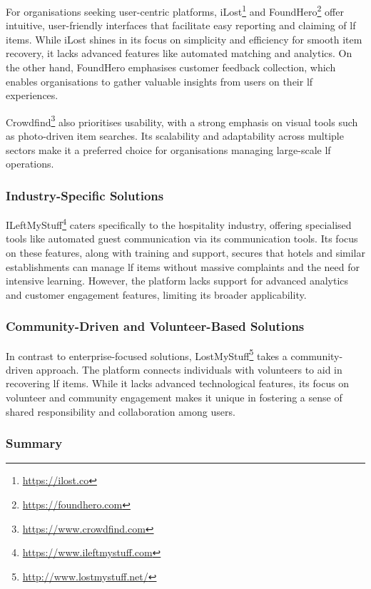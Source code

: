 For organisations seeking user-centric platforms, iLost\footnote{\url{https://ilost.co}} and FoundHero\footnote{\url{https://foundhero.com}} offer intuitive, user-friendly interfaces that facilitate easy reporting and claiming of \ac{lf} items. While iLost shines in its focus on simplicity and efficiency for smooth item recovery, it lacks advanced features like automated matching and analytics. On the other hand, FoundHero emphasises customer feedback collection, which enables organisations to gather valuable insights from users on their \ac{lf} experiences.

Crowdfind\footnote{\url{https://www.crowdfind.com}} also prioritises usability, with a strong emphasis on visual tools such as photo-driven item searches. Its scalability and adaptability across multiple sectors make it a preferred choice for organisations managing large-scale \ac{lf} operations.

\subsubsection{Industry-Specific Solutions} \label{subsubsec:industry-specific-solutions}

ILeftMyStuff\footnote{\url{https://www.ileftmystuff.com}} caters specifically to the hospitality industry, offering specialised tools like automated guest communication via its communication tools. Its focus on these features, along with training and support, secures that hotels and similar establishments can manage \ac{lf} items without massive complaints and the need for intensive learning. However, the platform lacks support for advanced analytics and customer engagement features, limiting its broader applicability.

\subsubsection{Community-Driven and Volunteer-Based Solutions} \label{subsubsec:community-driven-solutions}

In contrast to enterprise-focused solutions, LostMyStuff\footnote{\url{http://www.lostmystuff.net/}} takes a community-driven approach. The platform connects individuals with volunteers to aid in recovering \ac{lf} items. While it lacks advanced technological features, its focus on volunteer and community engagement makes it unique in fostering a sense of shared responsibility and collaboration among users.

\subsubsection{Summary} \label{subsubsec:lfms_summary}

